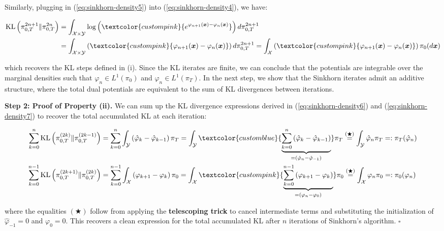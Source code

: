 \documentclass{article}
\newcommand{\bluetext}[1]{\textcolor{customblue}{#1}}
\newcommand{\pinktext}[1]{\textcolor{custompink}{#1}}
\begin{document}
Similarly, plugging in (\ref{eq:sinkhorn-density5}) into (\ref{eq:sinkhorn-density4}), we have:
\begin{small}
\begin{align}
    \text{KL}\left(\pi_{0,T}^{2n+1}\|\pi_{0,T}^{2n}\right)&=\int_{\mathcal{X}\times\mathcal{Y}}\log \left(\pinktext{e^{\varphi_{n+1}(\boldsymbol{x})-\varphi_{n}(\boldsymbol{x})}}\right)d\pi^{2n+1}_{0,T}\nonumber\\
    &=\int_{\mathcal{X}\times\mathcal{Y}} \left(\pinktext{\varphi_{n+1}(\boldsymbol{x})-\varphi_{n}(\boldsymbol{x})}\right)d\pi^{2n+1}_{0,T}=\int_{\mathcal{X}}\left(\pinktext{\varphi_{n+1}(\boldsymbol{x})-\varphi_{n}(\boldsymbol{x})}\right)\pi_0(d\boldsymbol{x}) \label{eq:sinkhorn-density7}
\end{align}
\end{small}
which recovers the KL steps defined in (i). Since the KL iterates are finite, we can conclude that the potentials are integrable over the marginal densities such that $\varphi_n\in L^1(\pi_0)$ and $\hat\varphi_n\in L^1(\pi_T)$. In the next step, we show that the Sinkhorn iterates admit an additive structure, where the total dual potentials are equivalent to the sum of KL divergences between iterations.

\textbf{Step 2: Proof of Property (ii). }
We can sum up the KL divergence expressions derived in (\ref{eq:sinkhorn-density6}) and (\ref{eq:sinkhorn-density7}) to recover the total accumulated KL at each iteration:
\begin{small}
\begin{align}
    \sum_{k=0}^{n}\text{KL}\left(\pi_{0,T}^{(2k)}\|\pi_{0,T}^{(2k-1)}\right)&=\sum_{k=0}^{n}\int_{\mathcal{Y}}\left(\hat{\varphi}_{k}-\hat{\varphi}_{k-1}\right)\pi_T=\int_{\mathcal{Y}}\bluetext{\underbrace{\sum_{k=0}^{n}\left(\hat{\varphi}_{k}-\hat{\varphi}_{k-1}\right)}_{=(\hat{\varphi}_{n}-\hat{\varphi}_{-1})}}\pi_T\overset{(\bigstar)}{=}\int_{\mathcal{Y}}\hat    \varphi_n\pi_T=:\pi_T(\hat{\varphi}_n)\\
    \sum_{k=0}^{n-1}\text{KL}\left(\pi_{0,T}^{(2k+1)}\|\pi_{0,T}^{(2k)}\right)&=\sum_{k=0}^{n-1}\int_{\mathcal{X}}\left(\varphi_{k+1}-\varphi_{k}\right)\pi_0=\int_{\mathcal{X}}\pinktext{\underbrace{\sum_{k=0}^{n-1}\left(\varphi_{k+1}-\varphi_{k}\right)}_{=(\varphi_{n}-\varphi_0)}}\pi_0\overset{(\bigstar)}{=}\int_{\mathcal{X}}\varphi_n\pi_0=:\pi_0(\varphi_n)
\end{align}
\end{small}
where the equalities $(\bigstar)$ follow from applying the \textbf{telescoping trick} to cancel intermediate terms and substituting the initialization of $\hat{\varphi}_{-1}=0$ and $\varphi_0=0$. This recovers a clean expression for the total accumulated KL after $n$ iterations of Sinkhorn's algorithm. \hfill $\square$
\end{document}
